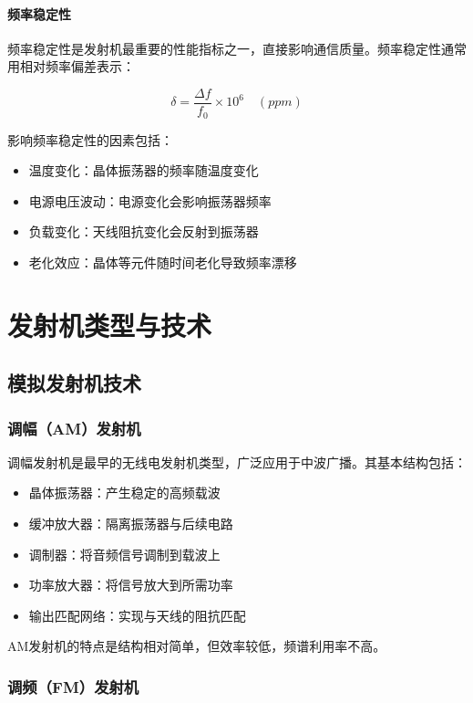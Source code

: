 \documentclass[12pt,UTF8]{ctexbook}
\begin{document}
\subsection{频率稳定性}

频率稳定性是发射机最重要的性能指标之一，直接影响通信质量。频率稳定性通常用相对频率偏差表示：

\begin{equation}
\delta = \frac{\Delta f}{f_0} \times 10^6 \quad (ppm)
\end{equation}

影响频率稳定性的因素包括：
\begin{itemize}[leftmargin=3.5em]
    \item 温度变化：晶体振荡器的频率随温度变化
    \item 电源电压波动：电源变化会影响振荡器频率
    \item 负载变化：天线阻抗变化会反射到振荡器
    \item 老化效应：晶体等元件随时间老化导致频率漂移
\end{itemize}

\part{发射机类型与技术}

\chapter{模拟发射机技术}

\section{调幅（AM）发射机}

调幅发射机是最早的无线电发射机类型，广泛应用于中波广播。其基本结构包括：

\begin{itemize}[leftmargin=3.5em]
    \item 晶体振荡器：产生稳定的高频载波
    \item 缓冲放大器：隔离振荡器与后续电路
    \item 调制器：将音频信号调制到载波上
    \item 功率放大器：将信号放大到所需功率
    \item 输出匹配网络：实现与天线的阻抗匹配
\end{itemize}

AM发射机的特点是结构相对简单，但效率较低，频谱利用率不高。

\section{调频（FM）发射机}
\end{document}
